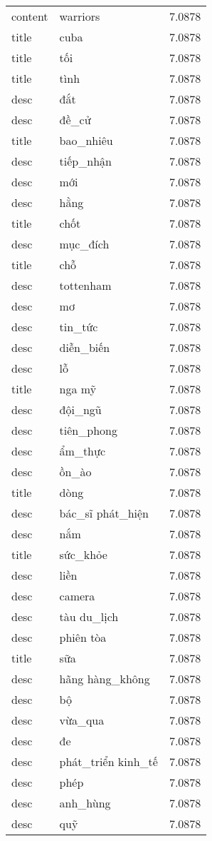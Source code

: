 \documentclass{article}
\begin{document}
\begin{tabular}{lll}
content & warriors & 7.0878\\
title & cuba & 7.0878\\
title & tối & 7.0878\\
title & tình & 7.0878\\
desc & đắt & 7.0878\\
desc & đề\_cử & 7.0878\\
title & bao\_nhiêu & 7.0878\\
desc & tiếp\_nhận & 7.0878\\
desc & mới & 7.0878\\
desc & hằng & 7.0878\\
title & chốt & 7.0878\\
desc & mục\_đích & 7.0878\\
title & chỗ & 7.0878\\
desc & tottenham & 7.0878\\
desc & mơ & 7.0878\\
desc & tin\_tức & 7.0878\\
desc & diễn\_biến & 7.0878\\
desc & lỗ & 7.0878\\
title & nga mỹ & 7.0878\\
desc & đội\_ngũ & 7.0878\\
desc & tiên\_phong & 7.0878\\
desc & ẩm\_thực & 7.0878\\
desc & ồn\_ào & 7.0878\\
title & dòng & 7.0878\\
desc & bác\_sĩ phát\_hiện & 7.0878\\
desc & nắm & 7.0878\\
title & sức\_khỏe & 7.0878\\
desc & liền & 7.0878\\
desc & camera & 7.0878\\
desc & tàu du\_lịch & 7.0878\\
desc & phiên tòa & 7.0878\\
title & sữa & 7.0878\\
desc & hãng hàng\_không & 7.0878\\
desc & bộ & 7.0878\\
desc & vừa\_qua & 7.0878\\
desc & đe & 7.0878\\
desc & phát\_triển kinh\_tế & 7.0878\\
desc & phép & 7.0878\\
desc & anh\_hùng & 7.0878\\
desc & quỹ & 7.0878\\

\end{tabular}
\end{document}
